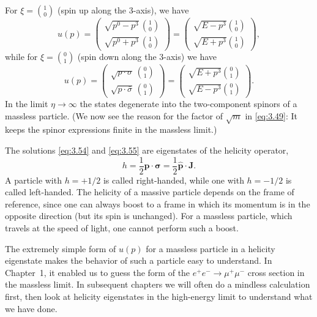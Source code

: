 For $\xi = \binom{1}{0}$ (spin up along the 3-axis), we have
\begin{equation}
  u(p) = \begin{pmatrix}
    \sqrt{p^0-p^3}\,\binom{1}{0}\\
    \sqrt{p^0+p^3}\,\binom{1}{0}
  \end{pmatrix}
  = \begin{pmatrix}
    \sqrt{E-p^3}\binom{1}{0}\\
    \sqrt{E+p^3}\binom{1}{0}
  \end{pmatrix},
  \label{eq:3.54}
\end{equation}
while for $\xi = \binom{0}{1}$ (spin down along the 3-axis) we have
\begin{equation}
  u(p) = \begin{pmatrix}
    \sqrt{p\cdot\sigma}\,\binom{0}{1}\\
    \sqrt{p\cdot\bar{\sigma}}\,\binom{0}{1}
  \end{pmatrix}
  = \begin{pmatrix}
    \sqrt{E+p^3}\binom{0}{1}\\
    \sqrt{E-p^3}\binom{0}{1}
  \end{pmatrix}.
  \label{eq:3.55}
\end{equation}
In the limit $\eta\to\infty$ the states degenerate into the two-component
spinors of a massless particle.  (We now see the reason for the factor of
$\sqrt{m}$ in \eqref{eq:3.49}: It keeps the spinor expressions finite in the
massless limit.)

The solutions \eqref{eq:3.54} and \eqref{eq:3.55} are eigenstates of the
helicity operator,
\begin{equation}
  h = \frac{1}{2}\hat{\mathbf{p}}\cdot\bm{\sigma}
  = \frac{1}{2}\hat{\mathbf{p}}\cdot\mathbf{J}.
  \label{eq:3.56}
\end{equation}
A particle with $h = +1/2$ is called right-handed, while one with $h =
-1/2$ is called left-handed.  The helicity of a massive particle depends on
the frame of reference, since one can always boost to a frame in which its
momentum is in the opposite direction (but its spin is unchanged).  For a
massless particle, which travels at the speed of light, one cannot perform
such a boost.

The extremely simple form of $u(p)$ for a massless particle in a helicity
eigenstate makes the behavior of such a particle easy to understand.  In
Chapter~1, it enabled us to guess the form of the
$e^{+}e^{-}\to\mu^{+}\mu^{-}$ cross section in the massless limit.  In
subsequent chapters we will often do a mindless calculation first, then look
at helicity eigenstates in the high-energy limit to understand what we have
done.

